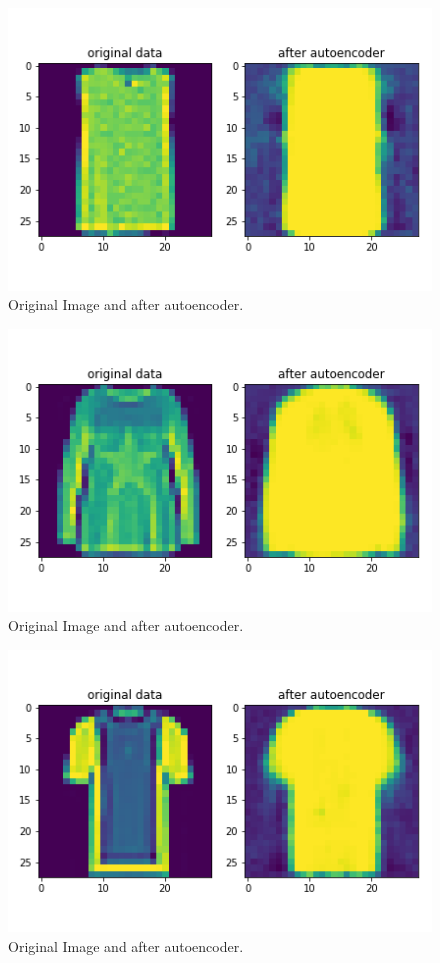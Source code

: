\documentclass[11pt,a4paper,oneside]{article}
\begin{document}
\begin{figure}[!btp]
	\centering
	\includegraphics[width=\textwidth]{figures/save_ev_6}
	\caption{Original Image and after autoencoder.}
\end{figure}
\begin{figure}[!btp]
	\centering
	\includegraphics[width=\textwidth]{figures/save_ev_7}
	\caption{Original Image and after autoencoder.}
\end{figure}
\begin{figure}[!btp]
	\centering
	\includegraphics[width=\textwidth]{figures/save_ev_8}
	\caption{Original Image and after autoencoder.}
\end{figure}
\end{document}
